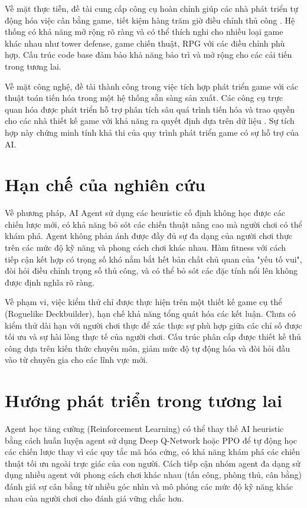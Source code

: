 Về mặt thực tiễn, đề tài cung cấp công cụ hoàn chỉnh giúp các nhà phát triển tự động hóa việc cân bằng game, tiết kiệm hàng trăm giờ điều chỉnh thủ công \cite{jaffe2012optimizing,nelson2016towards}. Hệ thống có khả năng mở rộng rõ ràng và có thể thích nghi cho nhiều loại game khác nhau như tower defense, game chiến thuật, RPG với các điều chỉnh phù hợp. Cấu trúc code base đảm bảo khả năng bảo trì và mở rộng cho các cải tiến trong tương lai.

Về mặt công nghệ, đề tài thành công trong việc tích hợp phát triển game với các thuật toán tiến hóa trong một hệ thống sẵn sàng sản xuất. Các công cụ trực quan hóa được phát triển hỗ trợ phân tích sâu quá trình tiến hóa và trao quyền cho các nhà thiết kế game với khả năng ra quyết định dựa trên dữ liệu \cite{smith2011analyzing}. Sự tích hợp này chứng minh tính khả thi của quy trình phát triển game có sự hỗ trợ của AI.

\section{Hạn chế của nghiên cứu}

Về phương pháp, AI Agent sử dụng các heuristic cố định không học được các chiến lược mới, có khả năng bỏ sót các chiến thuật nâng cao mà người chơi có thể khám phá. Agent không phản ánh được đầy đủ sự đa dạng của người chơi thực trên các mức độ kỹ năng và phong cách chơi khác nhau. Hàm fitness với cách tiếp cận kết hợp có trọng số khó nắm bắt hết bản chất chủ quan của "yếu tố vui", đòi hỏi điều chỉnh trọng số thủ công, và có thể bỏ sót các đặc tính nổi lên không được định nghĩa rõ ràng.

Về phạm vi, việc kiểm thử chỉ được thực hiện trên một thiết kế game cụ thể (Roguelike Deckbuilder), hạn chế khả năng tổng quát hóa các kết luận. Chưa có kiểm thử dài hạn với người chơi thực để xác thực sự phù hợp giữa các chỉ số được tối ưu và sự hài lòng thực tế của người chơi. Cấu trúc phân cấp được thiết kế thủ công dựa trên kiến thức chuyên môn, giảm mức độ tự động hóa và đòi hỏi đầu vào từ chuyên gia cho các lĩnh vực mới.

\section{Hướng phát triển trong tương lai}

Agent học tăng cường (Reinforcement Learning) có thể thay thế AI heuristic bằng cách huấn luyện agent sử dụng Deep Q-Network \cite{mnih2015human} hoặc PPO để tự động học các chiến lược thay vì các quy tắc mã hóa cứng, có khả năng khám phá các chiến thuật tối ưu ngoài trực giác của con người. Cách tiếp cận nhóm agent đa dạng sử dụng nhiều agent với phong cách chơi khác nhau (tấn công, phòng thủ, cân bằng) đánh giá sự cân bằng từ nhiều góc nhìn và mô phỏng các mức độ kỹ năng khác nhau của người chơi cho đánh giá vững chắc hơn.

